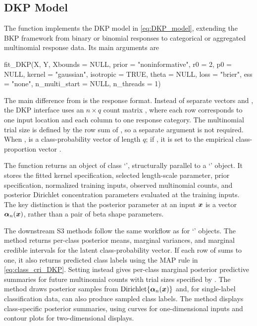 \documentclass[article, shortnames]{jss}
\newcommand{\class}[1]{`\code{#1}'}
\newcommand{\fct}[1]{\code{#1()}}
\renewcommand{\vec}[1]{\mbox{\boldmath ${#1}$}}
\begin{document}
\subsection{DKP Model}\label{sec:DKP_pkg}

The function \fct{fit\_DKP} implements the DKP model in \eqref{eq:DKP_model}, extending the BKP framework from binary or binomial responses to categorical or aggregated multinomial response data. Its main arguments are
\begin{Code}
fit_DKP(X, Y, Xbounds = NULL,
	prior = "noninformative", r0 = 2, p0 = NULL,
	kernel = "gaussian", isotropic = TRUE, theta = NULL,
	loss = "brier", ess = "none", n_multi_start = NULL, n_threads = 1)
\end{Code}
The main difference from \fct{fit\_BKP} is the response format. Instead of separate vectors  and , the DKP interface uses an $n \times q$ count matrix , where each row corresponds to one input location and each column to one response category. The multinomial trial size is defined by the row sum of , so a separate  argument is not required. When ,  is a class-probability vector of length $q$; if , it is set to the empirical class-proportion vector .

The function returns an object of class \class{DKP}, structurally parallel to a \class{BKP} object. It stores the fitted kernel specification, selected length-scale parameter, prior specification, normalized training inputs, observed multinomial counts, and posterior Dirichlet concentration parameters evaluated at the training inputs. The key distinction is that the posterior parameter at an input $\vec{x}$ is a vector $\vec{\alpha}_n(\vec{x})$, rather than a pair of beta shape parameters.

The downstream S3 methods follow the same workflow as for \class{BKP} objects. The \fct{predict} method returns per-class posterior means, marginal variances, and marginal credible intervals for the latent class-probability vector. If each row of  sums to one, it also returns predicted class labels using the MAP rule in \eqref{eq:class_cri_DKP}. Setting  instead gives per-class marginal posterior predictive summaries for future multinomial counts with trial sizes specified by . The \fct{simulate} method draws posterior samples from $\mathrm{Dirichlet}\{\vec{\alpha}_n(\vec{x})\}$ and, for single-label classification data, can also produce sampled class labels. The \fct{plot} method displays class-specific posterior summaries, using curves for one-dimensional inputs and contour plots for two-dimensional displays.
\end{document}
